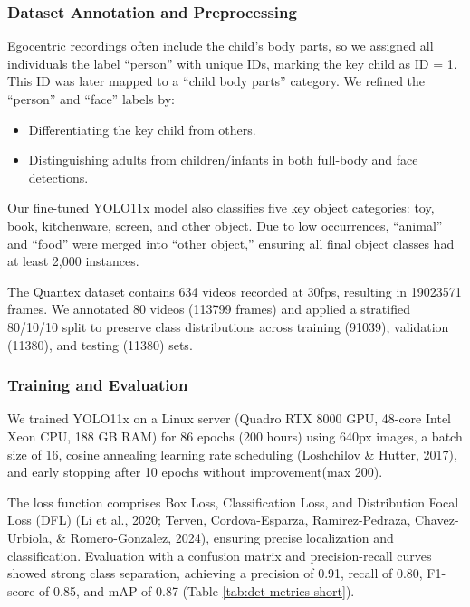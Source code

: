 \documentclass[
  man,floatsintext]{apa6}
\providecommand{\tightlist}{%
  \setlength{\itemsep}{0pt}\setlength{\parskip}{0pt}}
\begin{document}
\subsubsection{Dataset Annotation and Preprocessing}\label{dataset-annotation-and-preprocessing}

Egocentric recordings often include the child's body parts, so we assigned all individuals the label ``person'' with unique IDs, marking the key child as ID = 1. This ID was later mapped to a ``child body parts'' category. We refined the ``person'' and ``face'' labels by:

\begin{itemize}
\tightlist
\item
  Differentiating the key child from others.
\item
  Distinguishing adults from children/infants in both full-body and face detections.
\end{itemize}

Our fine-tuned YOLO11x model also classifies five key object categories: toy, book, kitchenware, screen, and other object. Due to low occurrences, ``animal'' and ``food'' were merged into ``other object,'' ensuring all final object classes had at least 2,000 instances.

The Quantex dataset contains 634 videos recorded at 30fps, resulting in 19023571 frames. We annotated 80 videos (113799 frames) and applied a stratified 80/10/10 split to preserve class distributions across training (91039), validation (11380), and testing (11380) sets.

\subsubsection{Training and Evaluation}\label{training-face}

We trained YOLO11x on a Linux server (Quadro RTX 8000 GPU, 48-core Intel Xeon CPU, 188 GB RAM) for 86 epochs (200 hours) using 640px images, a batch size of 16, cosine annealing learning rate scheduling (Loshchilov \& Hutter, 2017), and early stopping after 10 epochs without improvement(max 200).

The loss function comprises Box Loss, Classification Loss, and Distribution Focal Loss (DFL) (Li et al., 2020; Terven, Cordova-Esparza, Ramirez-Pedraza, Chavez-Urbiola, \& Romero-Gonzalez, 2024), ensuring precise localization and classification. Evaluation with a confusion matrix and precision-recall curves showed strong class separation, achieving a precision of 0.91, recall of 0.80, F1-score of 0.85, and mAP of 0.87 (Table \ref{tab:det-metrics-short}).
\end{document}
